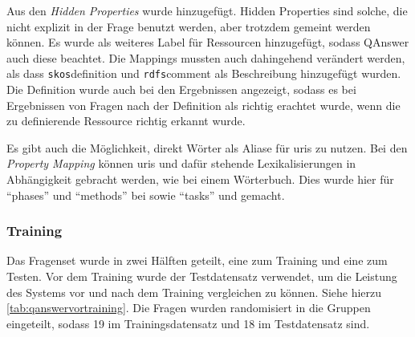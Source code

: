 Aus den \emph{Hidden Properties} wurde  hinzugefügt.
Hidden Properties sind solche, die nicht explizit in der Frage benutzt werden, aber trotzdem gemeint werden können.
Es wurde  als weiteres Label für Ressourcen hinzugefügt, sodass QAnswer auch diese beachtet.
Die Mappings mussten auch dahingehend verändert werden, als dass \texttt{skos}{definition}
und \texttt{rdfs}{comment} als Beschreibung hinzugefügt wurden.
Die Definition wurde auch bei den Ergebnissen angezeigt, sodass es bei Ergebnissen von Fragen nach der Definition als richtig erachtet wurde, wenn die zu definierende Ressource richtig erkannt wurde.

Es gibt auch die Möglichkeit, direkt Wörter als Aliase für \acp{uri} zu nutzen.
Bei den \emph{Property Mapping} können \acp{uri} und dafür stehende Lexikalisierungen in Abhängigkeit gebracht werden, wie bei einem Wörterbuch.
Dies wurde hier für \enquote{phases} und \enquote{methods} bei  sowie \enquote{tasks} und  gemacht.

\subsubsection{Training}

Das Fragenset wurde in zwei Hälften geteilt, eine zum Training und eine zum Testen.
Vor dem Training wurde der Testdatensatz verwendet, um die Leistung des Systems vor und nach dem Training vergleichen zu können.
Siehe hierzu \cref{tab:qanswervortraining}.
Die Fragen wurden randomisiert in die Gruppen eingeteilt, sodass 19 im Trainingsdatensatz und 18 im Testdatensatz sind.

